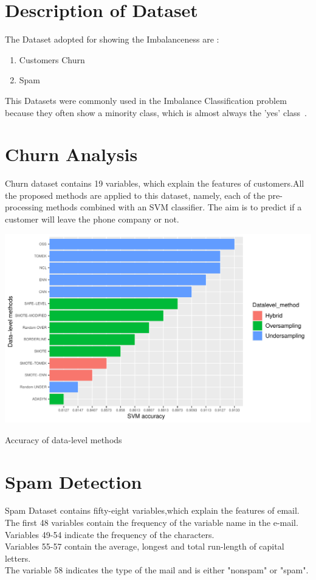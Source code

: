 \section{Description of Dataset}
The Dataset adopted for showing the Imbalanceness are :  
\begin{enumerate}
\item{Customers Churn} 
\item{Spam}  
\end{enumerate} 
This Datasets were commonly used in the Imbalance Classification problem because they often show a minority class, which is almost always the 'yes' class~\cite{zhu2019iric}.  



\section{Churn Analysis}
Churn dataset contains 19 variables, which explain the features of customers.All the proposed methods are applied to this dataset, namely, each of the pre-processing methods combined with an SVM classifier. The aim is to predict if a customer will leave the phone company or not. \\

\begin{center}
\includegraphics[width=1.1\textwidth]{Tesi_GabrieleCola/img/churn5.pdf}
\caption{Accuracy of data-level methods}
\end{center}



\section{Spam Detection}
Spam Dataset contains fifty-eight variables,which explain the features of email.  \\
The first 48 variables contain the frequency of the variable name in the e-mail.  \\
 Variables 49-54 indicate the frequency of the characters. \\
 Variables 55-57 contain the average, longest and total run-length of capital letters. \\
The variable 58 indicates the type of the mail and is either "nonspam" or "spam".\\

